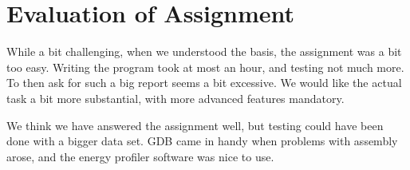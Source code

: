 \section{Evaluation of Assignment}

While a bit challenging, when we understood the basis, the assignment was a bit too easy.
Writing the program took at most an hour, and testing not much more.
To then ask for such a big report seems a bit excessive.
We would like the actual task a bit more substantial, with more advanced features mandatory.

We think we have answered the assignment well, but testing could have been done with a bigger data set.
GDB came in handy when problems with assembly arose, and the energy profiler software was nice to use.

